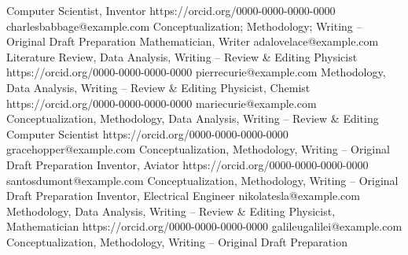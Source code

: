 {Computer Scientist, Inventor}
{https://orcid.org/0000-0000-0000-0000}
{charlesbabbage@example.com}
{Conceptualization; Methodology; Writing – Original Draft Preparation}
% 
{Mathematician, Writer}
{} 
{adalovelace@example.com}
{Literature Review, Data Analysis, Writing – Review \& Editing}
% 
{Physicist}
{https://orcid.org/0000-0000-0000-0000}
{pierrecurie@example.com}
{Methodology, Data Analysis, Writing – Review \& Editing}
% 
{Physicist, Chemist}
{https://orcid.org/0000-0000-0000-0000}
{mariecurie@example.com}
{Conceptualization, Methodology, Data Analysis, Writing – Review \& Editing}
% 
{Computer Scientist}
{https://orcid.org/0000-0000-0000-0000}
{gracehopper@example.com}
{Conceptualization, Methodology, Writing – Original Draft Preparation}
% 
{Inventor, Aviator}
{https://orcid.org/0000-0000-0000-0000}
{santosdumont@example.com}
{Conceptualization, Methodology, Writing – Original Draft Preparation}
%
{Inventor, Electrical Engineer}
{} 
{nikolatesla@example.com}
{Methodology, Data Analysis, Writing – Review \& Editing}
%
{Physicist, Mathematician}
{https://orcid.org/0000-0000-0000-0000}
{galileugalilei@example.com}
{Conceptualization, Methodology, Writing – Original Draft Preparation}
